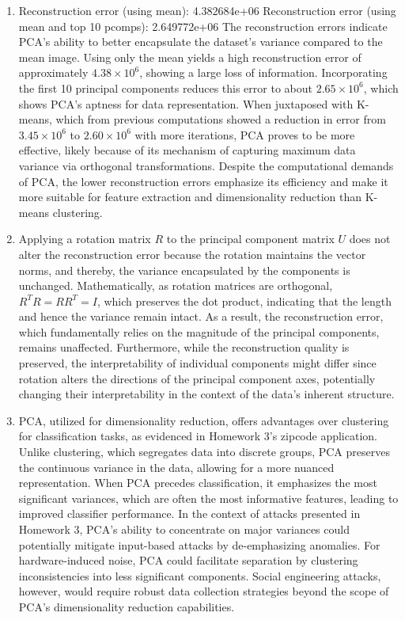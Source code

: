 \documentclass[submit]{harvardml}
\begin{document}
\begin{enumerate}
  \item Reconstruction error (using mean): 4.382684e+06
        Reconstruction error (using mean and top 10 pcomps): 2.649772e+06
        The reconstruction errors indicate PCA's ability to better encapsulate the dataset's variance compared to the mean image. Using only the mean yields a high reconstruction error of approximately \(4.38 \times 10^6\), showing a large loss of information. Incorporating the first 10 principal components reduces this error to about \(2.65 \times 10^6\), which shows PCA’s aptness for data representation. When juxtaposed with K-means, which from previous computations showed a reduction in error from \(3.45 \times 10^6\) to \(2.60 \times 10^6\) with more iterations, PCA proves to be more effective, likely because of its mechanism of capturing maximum data variance via orthogonal transformations. Despite the computational demands of PCA, the lower reconstruction errors emphasize its efficiency and make it more suitable for feature extraction and dimensionality reduction than K-means clustering.
  \item Applying a rotation matrix \( R \) to the principal component matrix \( U \) does not alter the reconstruction error because the rotation maintains the vector norms, and thereby, the variance encapsulated by the components is unchanged. Mathematically, as rotation matrices are orthogonal, \( R^TR = RR^T = I \), which preserves the dot product, indicating that the length and hence the variance remain intact. As a result, the reconstruction error, which fundamentally relies on the magnitude of the principal components, remains unaffected.  Furthermore, while the reconstruction quality is preserved, the interpretability of individual components might differ since rotation alters the directions of the principal component axes, potentially changing their interpretability in the context of the data's inherent structure.

  \item PCA, utilized for dimensionality reduction, offers advantages over clustering for classification tasks, as evidenced in Homework 3's zipcode application. Unlike clustering, which segregates data into discrete groups, PCA preserves the continuous variance in the data, allowing for a more nuanced representation. When PCA precedes classification, it emphasizes the most significant variances, which are often the most informative features, leading to improved classifier performance. In the context of attacks presented in Homework 3, PCA's ability to concentrate on major variances could potentially mitigate input-based attacks by de-emphasizing anomalies. For hardware-induced noise, PCA could facilitate separation by clustering inconsistencies into less significant components. Social engineering attacks, however, would require robust data collection strategies beyond the scope of PCA's dimensionality reduction capabilities.


\end{enumerate}
\end{document}
